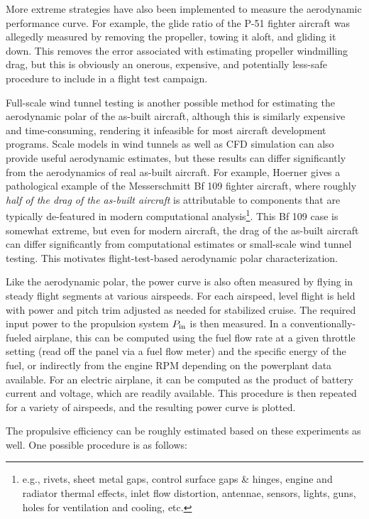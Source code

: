 More extreme strategies have also been implemented to measure the aerodynamic performance curve. For example, the glide ratio of the P-51 fighter aircraft was allegedly measured by removing the propeller, towing it aloft, and gliding it down. This removes the error associated with estimating propeller windmilling drag, but this is obviously an onerous, expensive, and potentially less-safe procedure to include in a flight test campaign.

Full-scale wind tunnel testing is another possible method for estimating the aerodynamic polar of the as-built aircraft, although this is similarly expensive and time-consuming, rendering it infeasible for most aircraft development programs. Scale models in wind tunnels as well as CFD simulation can also provide useful aerodynamic estimates, but these results can differ significantly from the aerodynamics of real as-built aircraft. For example, Hoerner \cite{hoerner_fluiddynamic_1965} gives a pathological example of the Messerschmitt Bf 109 fighter aircraft, where roughly \emph{half of the drag of the as-built aircraft} is attributable to components that are typically de-featured in modern computational analysis\footnote{e.g., rivets, sheet metal gaps, control surface gaps \& hinges, engine and radiator thermal effects, inlet flow distortion, antennae, sensors, lights, guns, holes for ventilation and cooling, etc.}. This Bf 109 case is somewhat extreme, but even for modern aircraft, the drag of the as-built aircraft can differ significantly from computational estimates or small-scale wind tunnel testing. This motivates flight-test-based aerodynamic polar characterization.

Like the aerodynamic polar, the power curve is also often measured by flying in steady flight segments at various airspeeds. For each airspeed, level flight is held with power and pitch trim adjusted as needed for stabilized cruise. The required input power to the propulsion system $P_{\rm in}$ is then measured. In a conventionally-fueled airplane, this can be computed using the fuel flow rate at a given throttle setting (read off the panel via a fuel flow meter) and the specific energy of the fuel, or indirectly from the engine RPM depending on the powerplant data available. For an electric airplane, it can be computed as the product of battery current and voltage, which are readily available. This procedure is then repeated for a variety of airspeeds, and the resulting power curve is plotted.

The propulsive efficiency can be roughly estimated based on these experiments as well. One possible procedure is as follows:

